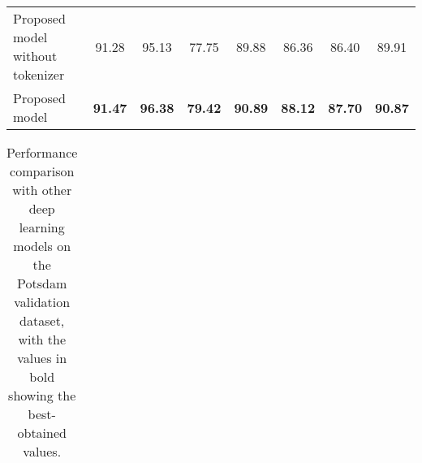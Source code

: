 \documentclass[journal]{IEEEtran}
\begin{document}
\begin{table*}
\begin{tabular}{lccccccc}
Proposed model without tokenizer & 91.28                  & 95.13                & 77.75                & 89.88            & 86.36           & 86.40                                 & 89.91                                         \\
Proposed~ model                  & \textbf{91.47}                 & \textbf{96.38}                & \textbf{79.42}               & \textbf{90.89}            & \textbf{88.12}           & \textbf{87.70}                                 & \textbf{90.87}                                         \\
\hline
\end{tabular}
\label{table:1}
\end{table*}

\begin{table*}
\renewcommand{\arraystretch}{1.25}
\caption{Performance comparison with other deep learning models on the Potsdam validation dataset, with the values in bold showing the best-obtained values.}
\centering
\begin{tabular}{lccccccc} 
\hline


\end{tabular}
\end{table*}
\end{document}
